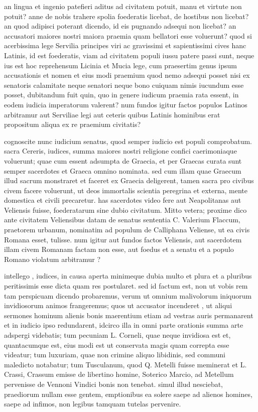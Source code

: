  an lingua et ingenio patefieri aditus ad civitatem potuit, manu et virtute non potuit? anne de nobis trahere spolia foederatis licebat, de hostibus non licebat? an quod adipisci poterant dicendo, id eis pugnando adsequi non licebat? an accusatori maiores nostri maiora praemia quam bellatori esse voluerunt? quod si acerbissima lege Servilia principes viri ac gravissimi et sapientissimi cives hanc Latinis, id est foederatis, viam ad civitatem populi iussu patere passi sunt, neque ius est hoc reprehensum Licinia et Mucia lege, cum praesertim genus ipsum accusationis et nomen et eius modi praemium quod nemo adsequi posset nisi ex senatoris calamitate neque senatori neque bono cuiquam nimis iucundum esse posset, dubitandum fuit quin, quo in genere iudicum praemia rata essent, in eodem iudicia imperatorum valerent? num fundos igitur factos populos Latinos arbitramur aut Serviliae legi aut ceteris quibus Latinis hominibus erat propositum aliqua ex re praemium civitatis?

 cognoscite nunc iudicium senatus, quod semper iudicio est populi comprobatum. sacra Cereris, iudices, summa maiores nostri religione confici caerimoniaque voluerunt; quae cum essent adsumpta de Graecia, et per Graecas curata sunt semper sacerdotes et Graeca omnino nominata. sed cum illam quae Graecum illud sacrum monstraret et faceret ex Graecia deligerent, tamen sacra pro civibus civem facere voluerunt, ut deos immortalis scientia peregrina et externa, mente domestica et civili precaretur. has sacerdotes video fere aut Neapolitanas aut Veliensis fuisse, foederatarum sine dubio civitatum. Mitto vetera; proxime dico ante civitatem Veliensibus datam de senatus sententia C. Valerium Flaccum, praetorem urbanum, nominatim ad populum de Calliphana Veliense, ut ea civis Romana esset, tulisse. num igitur aut fundos factos Veliensis, aut sacerdotem illam civem Romanam factam non esse, aut foedus et a senatu et a populo Romano violatum arbitramur ?

 intellego , iudices, in causa aperta minimeque dubia multo et plura et a pluribus peritissimis esse dicta quam res postularet. sed id factum est, non ut vobis rem tam perspicuam dicendo probaremus, verum ut omnium malivolorum iniquorum invidiosorum animos frangeremus; quos ut accusator incenderet , ut aliqui sermones hominum alienis bonis maerentium etiam ad vestras auris permanarent et in iudicio ipso redundarent, idcirco illa in omni parte orationis summa arte adspergi videbatis; tum pecuniam L. Corneli, quae neque invidiosa est et, quantacumque est, eius modi est ut conservata magis quam correpta esse videatur; tum luxuriam, quae non crimine aliquo libidinis, sed communi maledicto notabatur; tum Tusculanum, quod Q. Metelli fuisse meminerat et L. Crassi, Crassum emisse de libertino homine, Soterico Marcio, ad Metellum pervenisse de Vennoni Vindici bonis non tenebat. simul illud nesciebat, praediorum nullam esse gentem, emptionibus ea solere saepe ad alienos homines, saepe ad infimos, non legibus tamquam tutelas pervenire.

